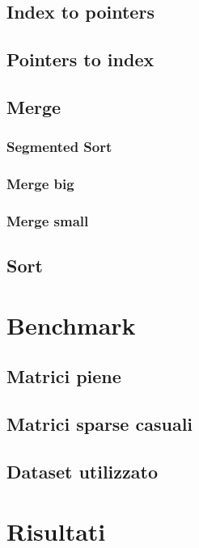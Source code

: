 \documentclass[]{IEEEtran}
\begin{document}
	\subsection{Index to pointers}
	\label{idx-to-pnt}
	
	\subsection{Pointers to index}
	\label{pnt-to-idx}
	
	\subsection{Merge}
	\label{merge}
		\subsubsection{Segmented Sort}	

		\subsubsection{Merge big}	

		\subsubsection{Merge small}	
		
	\subsection{Sort}
	\label{sort}
	

\section{Benchmark}
\label{benchmark}
	\subsection{Matrici piene}
	
	\subsection{Matrici sparse casuali}

	\subsection{Dataset utilizzato}
	
	
\section{Risultati}
\label{risultati}
\end{document}
